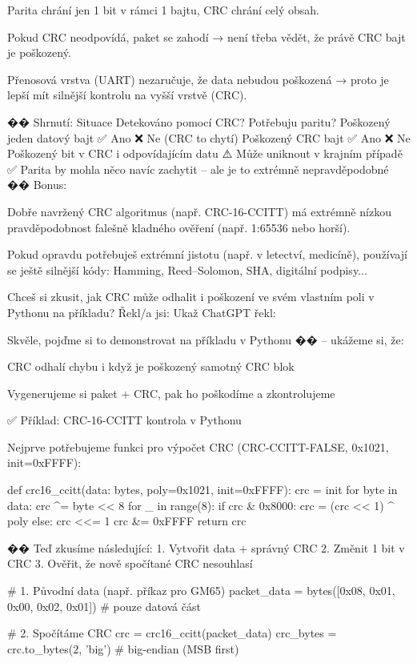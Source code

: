     Parita chrání jen 1 bit v rámci 1 bajtu, CRC chrání celý obsah.

    Pokud CRC neodpovídá, paket se zahodí → není třeba vědět, že právě CRC bajt je poškozený.

    Přenosová vrstva (UART) nezaručuje, že data nebudou poškozená → proto je lepší mít silnější kontrolu na vyšší vrstvě (CRC).

�� Shrnutí:
Situace	Detekováno pomocí CRC?	Potřebuju paritu?
Poškozený jeden datový bajt	✅ Ano	❌ Ne (CRC to chytí)
Poškozený CRC bajt	✅ Ano	❌ Ne
Poškozený bit v CRC i odpovídajícím datu	⚠️ Může uniknout v krajním případě	✅ Parita by mohla něco navíc zachytit – ale je to extrémně nepravděpodobné
�� Bonus:

    Dobře navržený CRC algoritmus (např. CRC-16-CCITT) má extrémně nízkou pravděpodobnost falešně kladného ověření (např. 1:65536 nebo horší).

    Pokud opravdu potřebuješ extrémní jistotu (např. v letectví, medicíně), používají se ještě silnější kódy: Hamming, Reed–Solomon, SHA, digitální podpisy...

Chceš si zkusit, jak CRC může odhalit i poškození ve svém vlastním poli v Pythonu na příkladu?
Řekl/a jsi:
Ukaž
ChatGPT řekl:

Skvěle, pojďme si to demonstrovat na příkladu v Pythonu �� – ukážeme si, že:

    CRC odhalí chybu i když je poškozený samotný CRC blok

    Vygenerujeme si paket + CRC, pak ho poškodíme a zkontrolujeme

✅ Příklad: CRC-16-CCITT kontrola v Pythonu

Nejprve potřebujeme funkci pro výpočet CRC (CRC-CCITT-FALSE, 0x1021, init=0xFFFF):

def crc16_ccitt(data: bytes, poly=0x1021, init=0xFFFF):
    crc = init
    for byte in data:
        crc ^= byte << 8
        for _ in range(8):
            if crc & 0x8000:
                crc = (crc << 1) ^ poly
            else:
                crc <<= 1
            crc &= 0xFFFF
    return crc

�� Teď zkusíme následující:
1. Vytvořit data + správný CRC
2. Změnit 1 bit v CRC
3. Ověřit, že nově spočítané CRC nesouhlasí

# 1. Původní data (např. příkaz pro GM65)
packet_data = bytes([0x08, 0x01, 0x00, 0x02, 0x01])  # pouze datová část

# 2. Spočítáme CRC
crc = crc16_ccitt(packet_data)
crc_bytes = crc.to_bytes(2, 'big')  # big-endian (MSB first)

